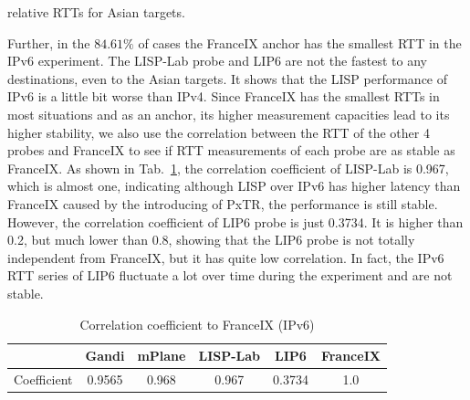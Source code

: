 relative RTTs for Asian targets.

Further, in the $84.61\%$ of cases the FranceIX anchor has the smallest RTT in the IPv6 experiment. The LISP-Lab probe and LIP6 are not the fastest to any destinations, even to the Asian targets. It shows that the LISP performance of IPv6 is a little bit worse than IPv4. Since FranceIX has the smallest RTTs in most situations and as an anchor, its higher measurement capacities lead to its higher stability, we also use the correlation between the RTT of the other 4 probes and FranceIX to see if RTT measurements of each probe are as stable as FranceIX. As shown in Tab.~\ref{correlation_v6_2016}, the correlation coefficient of LISP-Lab is 0.967, which is almost one, indicating although LISP over IPv6 has higher latency than FranceIX caused by the introducing of PxTR, the performance is still stable. However, the correlation coefficient of LIP6 probe is just 0.3734. It is higher than 0.2, but much lower than 0.8, showing that the LIP6 probe is not totally independent from FranceIX, but it has quite low correlation. In fact, the IPv6 RTT series of LIP6 fluctuate a lot over time during the experiment and are not stable.

%
\begin{table}[!tb]
	\centering
	\caption{Correlation coefficient to FranceIX (IPv6)}
	\label{correlation_v6_2016}{
		\begin{tabular}{@{}c|c|c|c|c|c@{}}
			\hline\hline
			& Gandi  & mPlane  & LISP-Lab  & LIP6 &  FranceIX \\ \hline
			Coefficient &  0.9565 & 0.968 & 0.967 & 0.3734 & 1.0     	\\  \hline\hline                 
		\end{tabular}
	}
\end{table}

